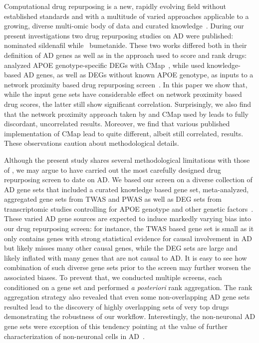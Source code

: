 \documentclass[letterpaper]{article}
\begin{document}
Computational drug repurposing is a new, rapidly evolving field without
established standards and with a multitude of varied approaches applicable to
a growing, diverse multi-omic body of data and curated
knowledge~\citep{Pushpakom2019}.  During our present investigations two drug
repurposing studies on AD were published: \cite{Fang2021} nominated sildenafil
while~\cite{Taubes2021} bumetanide.  These two works differed both in their
definition of AD genes as well as in the approach used to score and rank
drugs: \cite{Taubes2021} analyzed APOE genotype-specific DEGs with
CMap~\citep{Lamb2006}, while \cite{Fang2021} used knowledge-based AD genes, as
well as DEGs without known APOE genotype, as inputs to a network proximity
based drug repurposing screen~\citep{Cheng2018}.  In this paper we show that,
while the input gene sets have considerable effect on network proximity based
drug scores, the latter still show significant correlation.  Surprisingly, we
also find that the network proximity approach taken by \cite{Fang2021} and
CMap used by \cite{Taubes2021} leads to fully discordant, uncorrelated
results.  Moreover, we find that various published implementation of CMap lead
to quite different, albeit still correlated, results.  These observations
caution about methodological details.

Although the present study shares several methodological limitations with
those of \cite{Fang2021,Taubes2021}, we may argue to have carried out the most
carefully designed drug repurposing screen to date on AD.  We based our screen
on a diverse collection of AD gene sets that included a curated knowledge
based gene set, meta-analyzed, aggregated gene sets from TWAS and PWAS as well
as DEG sets from transcriptomic studies controlling for APOE genotype and
other genetic factors~\citep{Lin2018}.  These varied AD gene sources are
expected to induce markedly varying bias into our drug repurposing screen: for
instance, the TWAS based gene set is small as it only contains genes with
strong statistical evidence for causal involvement in AD but likely misses
many other causal genes, while the DEG sets are large and likely inflated with
many genes that are not causal to AD.  It is easy to see how combination of
such diverse gene sets prior to the screen may further worsen the associated
biases. To prevent that, we conducted multiple screens, each conditioned on a
gene set and performed \emph{a posteriori} rank aggregation.  The rank
aggregation strategy also revealed that even some non-overlapping AD gene sets
resulted lead to the discovery of highly overlapping sets of very top drugs
demonstrating the robustness of our workflow.  Interestingly, the non-neuronal
AD gene sets were exception of this tendency pointing at the value of further
characterization of non-neuronal cells in
AD~\citep{Lopes2022,Mathys2019,DeStrooper2016}.
\end{document}
